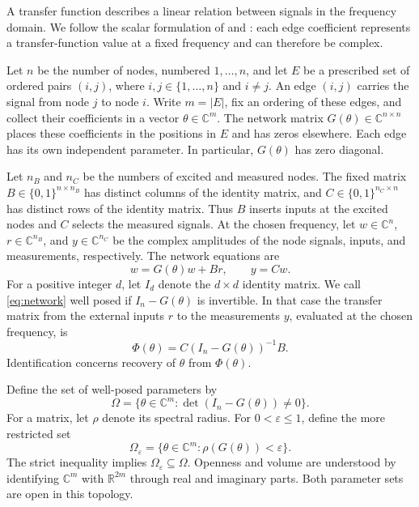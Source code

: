 \documentclass[letterpaper,10pt,conference]{ieeeconf}
\begin{document}
A transfer function describes a linear relation between signals in the
frequency domain. We follow the scalar formulation of
\cite[Secs.~I and III]{LH20} and \cite[Sec.~III-B]{LH24}: each edge
coefficient represents a transfer-function value at a fixed frequency and
can therefore be complex.

Let \(n\) be the number of nodes, numbered \(1,\ldots,n\), and let \(E\)
be a prescribed set of ordered pairs \((i,j)\), where
\(i,j\in\{1,\ldots,n\}\) and \(i\ne j\). An edge
\((i,j)\) carries the signal from node \(j\) to node \(i\).
Write \(m=|E|\), fix an ordering of these edges, and collect their
coefficients in a vector \(\theta\in\mathbb C^m\). The network matrix
\(G(\theta)\in\mathbb C^{n\times n}\) places these coefficients in the
positions in \(E\) and has zeros elsewhere. Each edge has its own
independent parameter. In particular, \(G(\theta)\) has zero diagonal.

Let \(n_B\) and \(n_C\) be the numbers of excited and measured nodes.
The fixed matrix \(B\in\{0,1\}^{n\times n_B}\) has distinct columns of
the identity matrix, and \(C\in\{0,1\}^{n_C\times n}\) has distinct rows
of the identity matrix. Thus \(B\) inserts inputs at the excited nodes
and \(C\) selects the measured signals. At the chosen frequency, let
\(w\in\mathbb C^n\), \(r\in\mathbb C^{n_B}\), and
\(y\in\mathbb C^{n_C}\) be the complex amplitudes of the node signals,
inputs, and measurements, respectively. The network equations are
\begin{equation}\label{eq:network}
 w=G(\theta)w+Br,\qquad y=Cw.
\end{equation}
For a positive integer \(d\), let \(I_d\) denote the \(d\times d\)
identity matrix. We call \eqref{eq:network} well posed if
\(I_n-G(\theta)\) is invertible. In that case the transfer matrix
from the external inputs \(r\) to the measurements \(y\), evaluated
at the chosen frequency, is
\begin{equation}\label{eq:observation}
 \Phi(\theta)=C(I_n-G(\theta))^{-1}B.
\end{equation}
Identification concerns recovery of \(\theta\) from \(\Phi(\theta)\).

Define the set of well-posed parameters by
\[
 \Omega=\{\theta\in\mathbb C^m:\det(I_n-G(\theta))\ne0\}.
\]
For a matrix, let \(\rho\) denote its spectral radius. For
\(0<\varepsilon\le1\), define the more restricted set
\begin{equation}\label{eq:domain}
 \Omega_\varepsilon
   =\{\theta\in\mathbb C^m:\rho(G(\theta))<\varepsilon\}.
\end{equation}
The strict inequality implies \(\Omega_\varepsilon\subseteq\Omega\).
Openness and volume are understood by identifying \(\mathbb C^m\)
with \(\mathbb R^{2m}\) through real and imaginary parts.
Both parameter sets are open in this topology.
\end{document}

